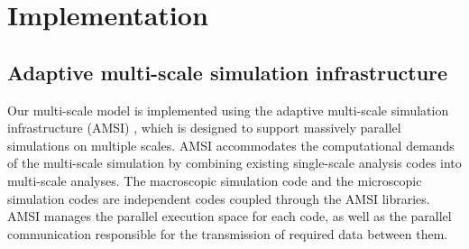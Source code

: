 \documentclass[]{interact}
\begin{document}
\section{Implementation}
\label{sec:implementation}

\subsection{Adaptive multi-scale simulation infrastructure}
Our multi-scale model is implemented using the adaptive multi-scale simulation infrastructure (AMSI) \citep{Tobin:2017ip}, which is designed to support massively parallel simulations on multiple scales. AMSI accommodates the computational demands of the multi-scale simulation by combining existing single-scale analysis codes into multi-scale analyses. The macroscopic simulation code and the microscopic simulation codes are independent codes coupled through the AMSI libraries. AMSI manages the parallel execution space for each code, as well as the parallel communication responsible for the transmission of required data between them. 

%
\end{document}
